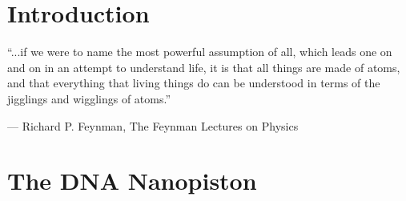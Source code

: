 \documentclass[11pt,a4paper,twoside]{vutinfth}
\newcounter{theo}[section] \setcounter{theo}{0}
\begin{document}

\newcommand\mycommfont[1]{\small\ttfamily\textcolor{blue}{#1}}

\frontmatter
\rmfamily

 \cleardoublepage
 \cleardoublepage
\setcounter{page}{0}

\cleardoublepage
 \cleardoublepage
\listoffigures \cleardoublepage
\linespread{0.816}
{\small \tableofcontents}
\cleardoublepage
\linespread{1}

\mainmatter
\setcounter{page}{0}

\chapter{Introduction}
\vspace{-0.5cm}
\epigraph{“...if we were to name the most powerful assumption of all, which leads one on
and on in an attempt to understand life, it is that all things are made of atoms, and
that everything that living things do can be understood in terms of the jigglings and
wigglings of atoms.”}
{--- \textup{Richard P. Feynman}, The Feynman Lectures on Physics}




 \cleardoublepage

\chapter{The DNA Nanopiston}



\end{document}

